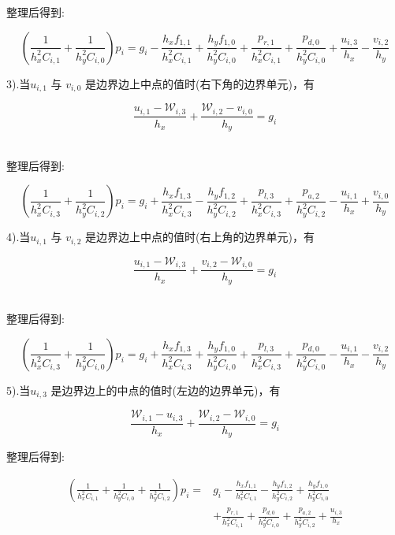 \documentclass[leqno]{article}
\begin{document}
整理后得到:

\begin{equation*}
(\frac{1}{h_x^2C_{i,1}} + \frac{1}{h_y^2C_{i,0}})p_i = g_i - \frac{h_xf_{1,1}}{h_x^2C_{i,1}} + \frac{h_yf_{1,0}}{h_y^2C_{i,0}} + \frac{p_{r,1}}{h_x^2C_{i,1}} + \frac{p_{d,0}}{h_y^2C_{i,0}} + \frac{u_{i,3}}{h_x} - \frac{v_{i,2}}{h_y}
\end{equation*}

3).当$u_{i,1}$ 与 $v_{i,0}$ 是边界边上中点的值时(右下角的边界单元)，有

\begin{equation*}
\frac{ u_{i,1} - \mathcal{W}_{i,3}}{h_x} + \frac{\mathcal{W}_{i,2} - v_{i,0}}{h_y} = g_i
\end{equation*}　

整理后得到:

\begin{equation*}
(\frac{1}{h_x^2C_{i,3}} + \frac{1}{h_y^2C_{i,2}})p_i = g_i + \frac{h_xf_{1,3}}{h_x^2C_{i,3}} - \frac{h_yf_{1,2}}{h_y^2C_{i,2}} + \frac{p_{l,3}}{h_x^2C_{i,3}} + \frac{p_{a,2}}{h_y^2C_{i,2}} - \frac{u_{i,1}}{h_x} + \frac{v_{i,0}}{h_y}
\end{equation*}

4).当$u_{i,1}$ 与 $v_{i,2}$ 是边界边上中点的值时(右上角的边界单元)，有

\begin{equation*}
\frac{ u_{i,1} - \mathcal{W}_{i,3}}{h_x} + \frac{ v_{i,2} - \mathcal{W}_{i,0}}{h_y} = g_i
\end{equation*}　

整理后得到:

\begin{equation*}
(\frac{1}{h_x^2C_{i,3}} + \frac{1}{h_y^2C_{i,0}})p_i = g_i + \frac{h_xf_{1,3}}{h_x^2C_{i,3}} + \frac{h_yf_{1,0}}{h_y^2C_{i,0}} + \frac{p_{l,3}}{h_x^2C_{i,3}} + \frac{p_{d,0}}{h_y^2C_{i,0}} - \frac{u_{i,1}}{h_x} - \frac{v_{i,2}}{h_y}
\end{equation*}

5).当$u_{i,3}$ 是边界边上的中点的值时(左边的边界单元)，有

\begin{equation*}
\frac{\mathcal{W}_{i,1} - u_{i,3}}{h_x} + \frac{\mathcal{W}_{i,2} - \mathcal{W}_{i,0}}{h_y} = g_i
\end{equation*}

整理后得到:

\begin{equation*}
\begin{aligned}
(\frac{1}{h_x^2C_{i,1}} + \frac{1}{h_y^2C_{i,0}} + \frac{1}{h_y^2C_{i,2}})p_i = & g_i - \frac{h_xf_{1,1}}{h_x^2C_{i,1}} - \frac{h_yf_{1,2}}{h_y^2C_{i,2}} + \frac{h_yf_{1,0}}{h_y^2C_{i,0}}\\
& + \frac{p_{r,1}}{h_x^2C_{i,1}} + \frac{p_{d,0}}{h_y^2C_{i,0}} + \frac{p_{a,2}}{h_y^2C_{i,2}} + \frac{u_{i,3}}{h_x}
\end{aligned}
\end{equation*}
\end{document}
